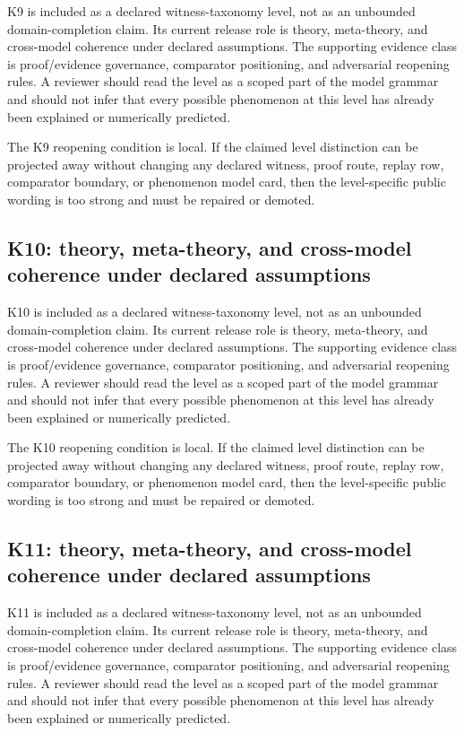 K9 is included as a declared witness-taxonomy level, not as an unbounded domain-completion claim. Its current release role is theory, meta-theory, and cross-model coherence under declared assumptions. The supporting evidence class is proof/evidence governance, comparator positioning, and adversarial reopening rules. A reviewer should read the level as a scoped part of the model grammar and should not infer that every possible phenomenon at this level has already been explained or numerically predicted.


The K9 reopening condition is local. If the claimed level distinction can be projected away without changing any declared witness, proof route, replay row, comparator boundary, or phenomenon model card, then the level-specific public wording is too strong and must be repaired or demoted.


\subsection{K10: theory, meta-theory, and cross-model coherence under declared assumptions}

K10 is included as a declared witness-taxonomy level, not as an unbounded domain-completion claim. Its current release role is theory, meta-theory, and cross-model coherence under declared assumptions. The supporting evidence class is proof/evidence governance, comparator positioning, and adversarial reopening rules. A reviewer should read the level as a scoped part of the model grammar and should not infer that every possible phenomenon at this level has already been explained or numerically predicted.


The K10 reopening condition is local. If the claimed level distinction can be projected away without changing any declared witness, proof route, replay row, comparator boundary, or phenomenon model card, then the level-specific public wording is too strong and must be repaired or demoted.


\subsection{K11: theory, meta-theory, and cross-model coherence under declared assumptions}

K11 is included as a declared witness-taxonomy level, not as an unbounded domain-completion claim. Its current release role is theory, meta-theory, and cross-model coherence under declared assumptions. The supporting evidence class is proof/evidence governance, comparator positioning, and adversarial reopening rules. A reviewer should read the level as a scoped part of the model grammar and should not infer that every possible phenomenon at this level has already been explained or numerically predicted.


